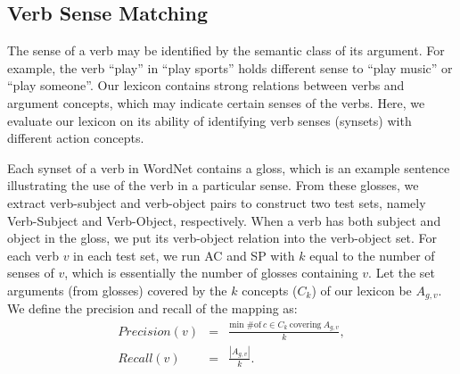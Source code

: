 \subsection{Verb Sense Matching}
\label{sec:synset}
The sense of a verb may be identified by the semantic class of its argument.
For example, the verb ``play'' in ``play sports'' holds different
sense to ``play music'' or ``play someone''.
Our lexicon contains strong relations between
verbs and argument concepts, which may indicate certain senses of
the verbs. Here, we evaluate our lexicon on its ability of identifying
verb senses (synsets) with different action concepts.

Each synset of a verb in WordNet contains a gloss, which is an example
sentence illustrating the use of the verb in a particular sense.
From these glosses, we extract verb-subject and verb-object pairs
to construct two test sets, namely Verb-Subject and Verb-Object, respectively.
When a verb has both subject and object in the gloss,
we put its verb-object relation into the verb-object set.
For each verb $v$ in each test set, we run AC and SP with $k$ equal to the
number of senses of $v$,
which is essentially the number of glosses containing $v$.
Let the set arguments (from glosses) covered by the $k$ concepts ($C_k$)
of our lexicon be $A_{g,v}$.
We define the precision
and recall of the mapping as:
\begin{eqnarray*}
Precision(v) &=& \frac{\mbox{min \# of}\ c\in C_k\ \mbox{covering}\ A_{g,v}}{k},\\
Recall(v) &=& \frac{|A_{g,v}|}{k}.\\
\end{eqnarray*}

